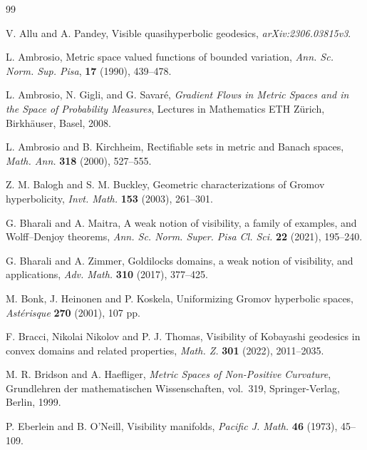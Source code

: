 \documentclass[a4paper,12pt]{amsart}
\theoremstyle{definition}
\begin{document}
	
	
	
	
	\begin{thebibliography}{99}
		
		
		
		{\sc V. Allu} and {\sc A. Pandey}, Visible quasihyperbolic geodesics, {\it arXiv:2306.03815v3}.
		
		{\sc L. Ambrosio}, Metric space valued functions of bounded variation, {\it Ann. Sc. Norm. Sup. Pisa}, {\bf 17} (1990), 439--478.
		
		{\sc L. Ambrosio}, {\sc N. Gigli}, and {\sc G. Savar\'e},
		{\it Gradient Flows in Metric Spaces and in the Space of Probability Measures},
		Lectures in Mathematics ETH Z\"urich, Birkh\"auser, Basel, 2008.
		
		
		{\sc L. Ambrosio} and {\sc B. Kirchheim}, Rectifiable sets in metric and Banach
		spaces, {\it Math. Ann.} {\bf 318} (2000), 527--555.
		
		{\sc Z. M. Balogh} and {\sc S. M. Buckley}, Geometric characterizations of Gromov hyperbolicity, {\it Invt. Math.} {\bf 153} (2003), 261--301.
		
		{\sc G. Bharali} and {\sc A. Maitra},
		A weak notion of visibility, a family of examples, and Wolff--Denjoy theorems,
		{\it Ann. Sc. Norm. Super. Pisa Cl. Sci.} {\bf 22} (2021), 195--240.
		
		{\sc G. Bharali} and {\sc A. Zimmer}, Goldilocks domains, a weak notion of visibility, and applications, {\it Adv. Math.} {\bf 310} (2017), 377--425.
		
		
		
		{\sc M. Bonk}, {\sc J. Heinonen} and {\sc P. Koskela},
		Uniformizing Gromov hyperbolic spaces,
		{\it Ast\'erisque} {\bf 270} (2001), 107 pp.
		
		{\sc F. Bracci}, {\sc Nikolai Nikolov} and {\sc P. J. Thomas}, Visibility of Kobayashi geodesics in convex domains and related properties, {\it Math. Z.} {\bf 301} (2022), 2011--2035.
		
		{\sc M. R. Bridson} and {\sc A. Haefliger},
		{\it Metric Spaces of Non-Positive Curvature},
		Grundlehren der mathematischen Wissenschaften, vol.~319, Springer-Verlag, Berlin, 1999.
		
		
		{\sc P. Eberlein} and {\sc B. O'Neill},
		Visibility manifolds,
		{\it Pacific J. Math.} {\bf 46} (1973), 45--109.
		

\end{thebibliography}
\end{document}
